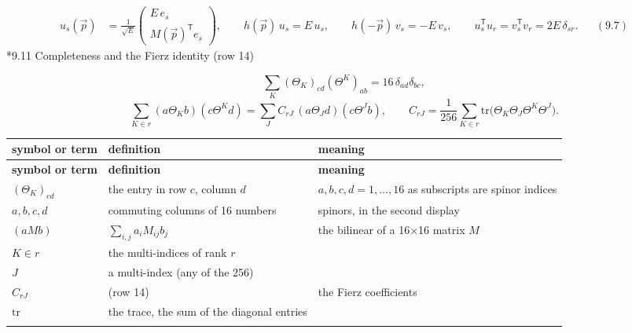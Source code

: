 \documentclass[10pt,a4paper]{article}
\makeatletter
\renewcommand\subsection{\@startsection{subsection}{2}{\z@}{-3.25ex\@plus -1ex \@minus -.2ex}{1.5ex \@plus .2ex}{\normalfont\large\bfseries\raggedright}}
\makeatother
\begin{document}
\begin{align*}
u_s(\vec p)&=\frac1{\sqrt E}\begin{pmatrix}E\,e_s\\M(\vec p)^{\mathsf T}e_s\end{pmatrix},\qquad h(\vec p)\,u_s=E\,u_s,\qquad h(-\vec p)\,v_s=-E\,v_s,\qquad u_s^{\mathsf T}u_r=v_s^{\mathsf T}v_r=2E\,\delta_{sr}.&&(9.7)
\end{align*}
\subsection*{9.11 Completeness and the Fierz identity (row 14)}
\begin{equation*}
\sum_K(\Theta_K)_{cd}(\Theta^K)_{ab}=16\,\delta_{ad}\delta_{bc},
\end{equation*}
\begin{equation*}
\sum_{K\in r}(a\Theta_Kb)(c\Theta^Kd)=\sum_JC_{rJ}\,(a\Theta_Jd)(c\Theta^Jb),\qquad C_{rJ}=\frac1{256}\sum_{K\in r}\mathrm{tr}\big(\Theta_K\Theta_J\Theta^K\Theta^J\big).
\end{equation*}
{\footnotesize
\begin{longtable}{>{\raggedright\arraybackslash}p{}>{\raggedright\arraybackslash}p{}>{\raggedright\arraybackslash}p{}}
\toprule
\textbf{symbol or term} & \textbf{definition} & \textbf{meaning} \\
\midrule\endfirsthead
\toprule
\textbf{symbol or term} & \textbf{definition} & \textbf{meaning} \\
\midrule\endhead
\endfoot
\bottomrule\endlastfoot
$(\Theta_K)_{cd}$ & the entry in row $c$, column $d$ & $a,b,c,d=1,\dots,16$ as subscripts are spinor indices \\
$a,b,c,d$ & commuting columns of 16 numbers & spinors, in the second display \\
$(aMb)$ & $\sum_{i,j}a_iM_{ij}b_j$ & the bilinear of a 16×16 matrix $M$ \\
$K\in r$ & the multi-indices of rank $r$ &  \\
$J$ & a multi-index (any of the 256) &  \\
$C_{rJ}$ & (row 14) & the Fierz coefficients \\
$\mathrm{tr}$ & the trace, the sum of the diagonal entries &  \\*
\end{longtable}}
\end{document}
